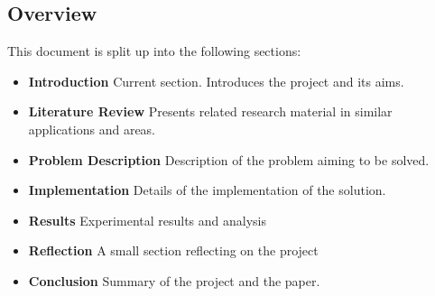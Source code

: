 \subsection{Overview}
This document is split up into the following sections:
\begin{itemize}
 \item \textbf{Introduction} Current section. Introduces the project and its aims.
 \item \textbf{Literature Review} Presents related research material in similar applications and areas.
 \item \textbf{Problem Description} Description of the problem aiming to be solved.
 \item \textbf{Implementation} Details of the implementation of the solution.
 \item \textbf{Results} Experimental results and analysis
 \item \textbf{Reflection} A small section reflecting on the project
 \item \textbf{Conclusion} Summary of the project and the paper.
\end{itemize}





